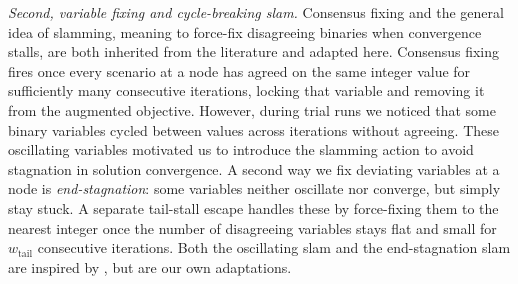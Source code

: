 \documentclass[12pt,a4paper]{article}
\begin{document}
\textit{Second, variable fixing and cycle-breaking slam.} Consensus fixing
\citep{watson2011progressive} and the general idea of slamming, meaning to force-fix
disagreeing binaries when convergence stalls, are both inherited from the literature
and adapted here. Consensus fixing fires
once every scenario at a node has agreed on the same integer value for sufficiently many
consecutive iterations, locking that variable and removing it from the augmented
objective. However, during trial runs we noticed that some binary variables cycled between values across iterations without agreeing. These oscillating variables motivated us to introduce the slamming action to avoid stagnation in solution convergence. 
A second way we fix deviating variables at a node is \textit{end-stagnation}: some variables neither oscillate nor converge, but simply stay stuck. A separate tail-stall escape handles
these by force-fixing them to the nearest integer once the number of disagreeing variables stays flat and small for $w_{\mathrm{tail}}$ consecutive iterations. Both the oscillating slam and the end-stagnation slam are inspired by \citet{watson2011progressive}, but are our own adaptations. 
\end{document}
